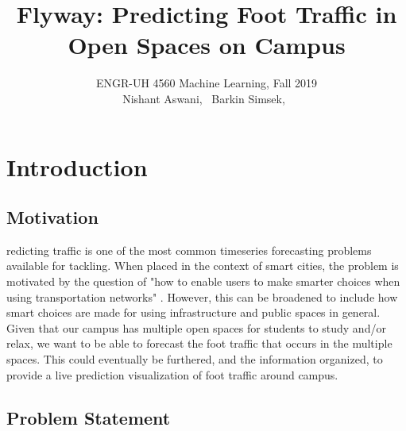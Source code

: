 \documentclass[journal, 11pt]{IEEEtran}
\begin{document}
{}
\setcounter{page}{1}

\title{\LARGE{Flyway: Predicting Foot Traffic in Open Spaces on Campus}}

\author{ ENGR-UH 4560 Machine Learning, Fall 2019\\
\medskip
Nishant Aswani,~
Barkin Simsek,~}%


%
{}

\maketitle




\section{Introduction}
\subsection{Motivation}
\lowercase{redicting} traffic is one of the most common timeseries forecasting problems available for tackling. When placed in the context of smart cities, the problem is motivated by the question of "how to enable users to make smarter choices when using transportation networks" \cite{lv2014traffic}. However, this can be broadened to include how smart choices are made for using infrastructure and public spaces in general. \\

\noindent Given that our campus has multiple open spaces for students to study and/or relax, we want to be able to forecast the foot traffic that occurs in the multiple spaces. This could eventually be furthered, and the information organized, to provide a live prediction visualization of foot traffic around campus.

\subsection{Problem Statement}
\end{document}
